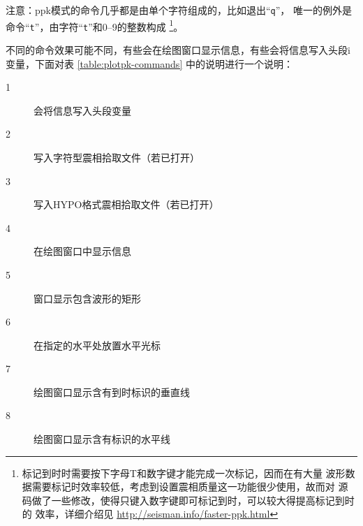 注意：ppk模式的命令几乎都是由单个字符组成的，比如退出``\texttt{q}''，
唯一的例外是命令``\texttt{t}''，由字符``\texttt{t}''和0--9的整数构成
\footnote{标记到时时需要按下字母T和数字键才能完成一次标记，因而在有大量
波形数据需要标记时效率较低，考虑到设置震相质量这一功能很少使用，故而对
源码做了一些修改，使得只键入数字键即可标记到时，可以较大得提高标记到时的
效率，详细介绍见 \url{http://seisman.info/faster-ppk.html}}。

不同的命令效果可能不同，有些会在绘图窗口显示信息，有些会将信息写入头段i
变量，下面对表 \ref{table:plotpk-commands} 中的说明进行一个说明：
\begin{description}
\item [1] 会将信息写入头段变量
\item [2] 写入字符型震相拾取文件（若已打开）
\item [3] 写入HYPO格式震相拾取文件（若已打开）
\item [4] 在绘图窗口中显示信息
\item [5] 窗口显示包含波形的矩形
\item [6] 在指定的水平处放置水平光标
\item [7] 绘图窗口显示含有到时标识的垂直线
\item [8] 绘图窗口显示含有标识的水平线
\end{description}
